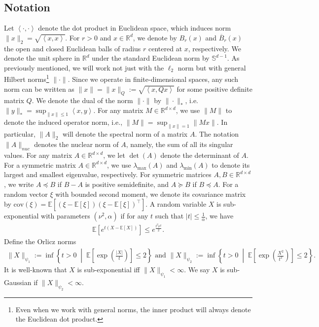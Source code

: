 \documentclass[11pt,twoside]{article}
\numberwithin{equation}{section}
\newcommand{\EE}{\mathbb{E}}
\newcommand{\RR}{\mathbb{R}}
\newcommand{\1}{\mathbf{1}}
\newcommand{\dotp}[1]{\left\langle #1\right\rangle}
\theoremstyle{remark}
\theoremstyle{plain}
\newcommand{\cov}{\mathrm{cov}}
\begin{document}
\subsection{Notation}\label{sec:notation}
Let $\dotp{\cdot,\cdot}$ denote the dot product in Euclidean space, which induces norm $\|x\|_2= \sqrt{\dotp{x,x}}$.  For $r > 0$ and $x \in \mathbb{R}^d$, we denote by $B_r(x)$ and $\overline{B}_r(x)$ the open and closed Euclidean balls of radius $r$ centered at $x$, respectively. We denote the unit sphere in \(\RR^d\) under the standard Euclidean norm by \(\mathbb{S}^{d-1}\). As previously mentioned, we will work not just with the $\ell_2$ norm but with general Hilbert norms\footnote{Even when we work with general norms, the inner product will always denote the Euclidean dot product.} $\|\cdot\|$. Since we operate in finite-dimensional spaces, any such norm can be written as $\| x \| = \|x\|_Q := \sqrt{\dotp{x,Q x}}$ for some positive definite matrix $Q$. We denote the dual of the norm $\|\cdot\|$ by $\|\cdot \|_*$, i.e.  $\|y\|_* = \sup_{\|x\| \le 1} \dotp{x,y}$.  For any matrix $M \in \RR^{d\times d}$, we use $\|M\|$ to denote the induced operator norm, i.e., $\|M\| = \sup_{\|x\| = 1} \|Mx\|$. In particular, $\|A\|_2$ will denote the spectral norm of a matrix $A$. The notation $\|A\|_{nuc}$ denotes the nuclear norm of $A$, namely, the sum of all its singular values. For any matrix $A\in\RR^{d\times d}$, we let $\det(A)$ denote the determinant of $A$. For a symmetric matrix $A \in \RR^{d\times d}$, we use $\lambda_{\max}(A)$ and $\lambda_{\min}(A)$ to denote its largest and smallest eigenvalue, respectively.  For symmetric matrices \(A,B \in \RR^{d\times d}\), we write \(A \preceq B\) if \(B-A\) is positive semidefinite, and \(A \succeq B\) if \(B \preceq A\). For a random vector $\xi$ with bounded second moment, we denote its covariance matrix by 
$\cov(\xi) = \EE[(\xi - \EE[\xi]) (\xi - \EE[\xi])^\top]$. 
A random variable $X$ is sub-exponential with parameters $(\nu^2, \alpha)$ if for any $t$ such that $|t| \le \frac{1}{\alpha}$, we have
\begin{align*}
	\EE[e^{t (X-\EE[X])}] \le e^{\frac{t^2 \nu^2}{2}}.
\end{align*}
  Define the Orlicz norms
	\begin{align*}
		\|X\|_{\psi_1} := \inf\left\{ t>0 \;\middle|\; \EE\!\left[\exp\!\left(\frac{|X|}{t}\right)\right] \le 2 \right\} \text{ and }
		\|X\|_{\psi_2} := \inf\left\{ t>0 \;\middle|\; \EE\!\left[\exp\!\left(\frac{X^2}{t^2}\right)\right] \le 2 \right\}.
	\end{align*}
	It is well-known that $X$ is sub-exponential iff $\|X\|_{\psi_1}<\infty$. We say $X$ is sub-Gaussian if $\|X\|_{\psi_2}<\infty$.
    
\end{document}
